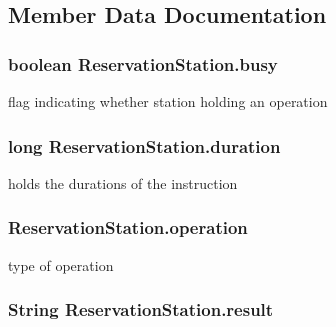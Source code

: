 \subsection{\-Member \-Data \-Documentation}
\hypertarget{classReservationStation_a0a2668bbae4e5d78dca63e3d38b4909f}{
\subsubsection[{busy}]{\setlength{\rightskip}{0pt plus 5cm}boolean {\bf \-Reservation\-Station.\-busy}}}\label{classReservationStation_a0a2668bbae4e5d78dca63e3d38b4909f}


flag indicating whether station holding an operation 

\hypertarget{classReservationStation_aa5e7a4c5ed6fd7e5e97782deb8feeeaa}{
\subsubsection[{duration}]{\setlength{\rightskip}{0pt plus 5cm}long {\bf \-Reservation\-Station.\-duration}}}\label{classReservationStation_aa5e7a4c5ed6fd7e5e97782deb8feeeaa}


holds the durations of the instruction 

\hypertarget{classReservationStation_a5dd33977e49327535ed47746caecd956}{
\subsubsection[{operation}]{ {\bf \-Reservation\-Station.\-operation}}}\label{classReservationStation_a5dd33977e49327535ed47746caecd956}


type of operation 

\hypertarget{classReservationStation_a7d8ec53057e9762a0592c8052704fd88}{
\subsubsection[{result}]{\setlength{\rightskip}{0pt plus 5cm}\-String {\bf \-Reservation\-Station.\-result}}}\label{classReservationStation_a7d8ec53057e9762a0592c8052704fd88}



